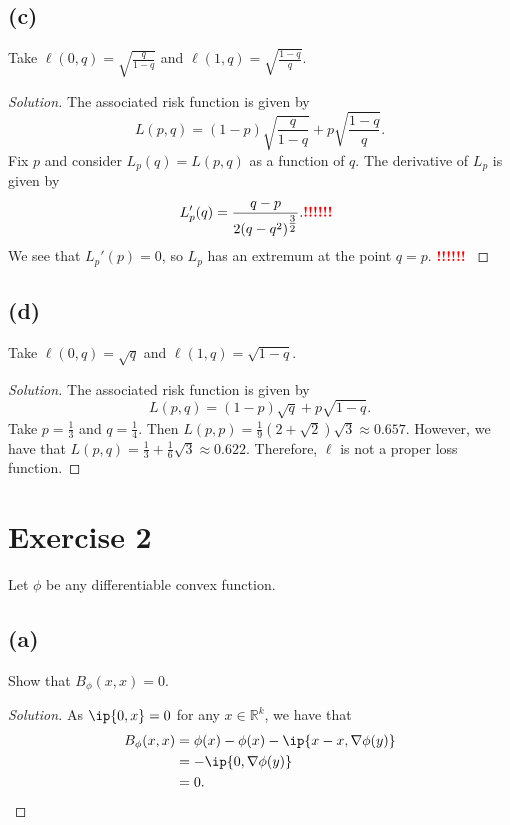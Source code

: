\documentclass[10pt, a4paper, twoside]{amsart}
\newcommand{\R}{\ensuremath{\mathbb{R}}}
\DeclarePairedDelimiter{\ip}\langle\rangle
\newenvironment{solution}
               {\let\oldqedsymbol=\qedsymbol
                \renewcommand{\qedsymbol}{$\blacktriangleleft$}
                \begin{proof}[Solution]}
               {\end{proof}
                \renewcommand{\qedsymbol}{\oldqedsymbol}}
\newcommand{\TODO}{\textcolor{red}{\textbf{!!!!!! }}}
\begin{document}
\subsection*{(c)}
Take $\ell(0,q)=\sqrt{\frac{q}{1-q}}$ and $\ell(1,q)=\sqrt{\frac{1-q}{q}}$.
\begin{solution}
The associated risk function is given by
\begin{equation*}
L(p,q)=(1-p)\sqrt{\frac{q}{1-q}}+p\sqrt{\frac{1-q}{q}}.
\end{equation*}
Fix $p$ and consider $L_p(q)=L(p,q)$ as a function of $q$.
The derivative of $L_p$ is given by
\begin{equation*}
L_p'(q)=\frac{q-p}{2(q-q^2)^{\tfrac{3}{2}}}. \TODO
\end{equation*}
We see that $L_p'(p)=0$, so $L_p$ has an extremum at the point $q=p$. \TODO
\end{solution}

\subsection*{(d)}
Take $\ell(0,q)=\sqrt{q}$ and $\ell(1,q)=\sqrt{1-q}$.
\begin{solution}
The associated risk function is given by
\begin{equation*}
L(p,q)=(1-p)\sqrt{q}+p\sqrt{1-q}.
\end{equation*}
Take $p=\tfrac{1}{3}$ and $q=\tfrac{1}{4}$. Then $L(p,p)= \tfrac{1}{9}(2+\sqrt{2})\sqrt{3}\approx 0.657$.
However, we have that $L(p,q)=\tfrac{1}{3}+\tfrac{1}{6}\sqrt{3} \approx 0.622$.
Therefore, $\ell$ is not a proper loss function.
\end{solution}

\section*{Exercise 2}
Let $\phi$ be any differentiable convex function.
\subsection*{(a)}
Show that $B_{\phi}(x,x)=0$.
\begin{solution}
As $\ip{0,x}=0$ for any $x \in  \R^k$, we have that
\begin{align*}
  B_{\phi}(x,x)&=\phi(x)-\phi(x)-\ip{x-x,\nabla \phi(y)} \\
  &=-\ip{0,\nabla \phi(y)} \\
  &=0.
\end{align*}
\end{solution}
\end{document}
